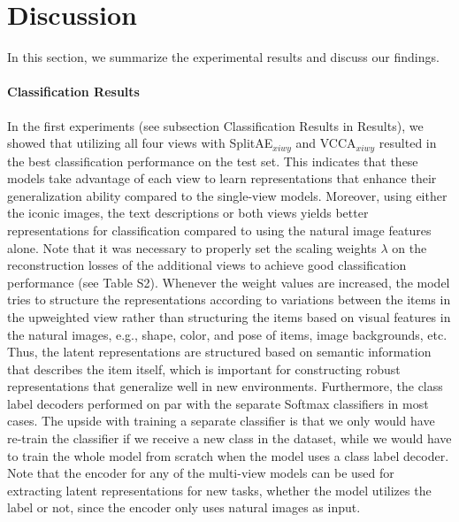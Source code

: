 \section{Discussion}\label{paperB:sec:discussion}

In this section, we summarize the experimental results and discuss our findings.

\paragraph{Classification Results} In the first experiments (see subsection Classification Results in Results),
we showed that utilizing all four views with SplitAE$_{x i w y}$ and VCCA$_{x i w y}$ resulted in the best classification performance on the test set. This indicates that these models take advantage of each view to learn representations that enhance their generalization ability compared to the single-view models. Moreover, using either the iconic images, the text descriptions or both views yields better representations for classification compared to using the natural image features alone. Note that it was necessary to properly set the scaling weights $\lambda$ on the reconstruction losses of the additional views to achieve good classification performance (see Table S2).
Whenever the weight values are increased, the model tries to structure the representations according to variations between the items in the upweighted view rather than structuring the items based on visual features in the natural images, e.g., shape, color, and pose of items, image backgrounds, etc. 
Thus, the latent representations are structured based on semantic information that describes the item itself, which is important for constructing robust representations that generalize well in new environments. Furthermore, the class label decoders performed on par with the separate Softmax classifiers in most cases. The upside with training a separate classifier is that we only would have re-train the classifier if we receive a new class in the dataset, while we would have to train the whole model from scratch when the model uses a class label decoder. Note that the encoder for any of the multi-view models can be used for extracting latent representations for new tasks, whether the model utilizes the label or not, since the encoder only uses natural images as input. 


